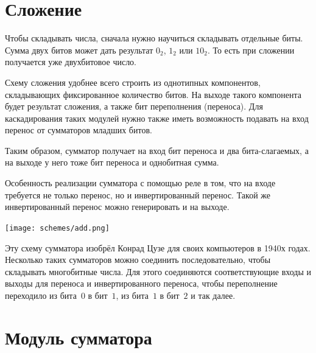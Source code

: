 \section{Сложение}


Чтобы складывать числа, сначала нужно научиться складывать отдельные биты.
Сумма двух битов может дать результат $0_2$, $1_2$ или $10_2$.
То есть при сложении получается уже двухбитовое число.

Схему сложения удобнее всего строить из однотипных компонентов, складывающих
фиксированное количество битов. На выходе такого компонента будет результат
сложения, а также бит переполнения (переноса). Для каскадирования
таких модулей нужно также иметь возможность подавать на вход перенос от
сумматоров младших битов.

Таким образом, сумматор получает на вход бит переноса и два бита-слагаемых, а на выходе
у него тоже бит переноса и однобитная сумма.


Особенность реализации сумматора с помощью реле в том, что на входе
требуется не только перенос, но и инвертированный перенос.
Такой же инвертированный перенос можно генерировать и на выходе.

\begin{center}
\texttt{[image: schemes/add.png]}
\end{center}

Эту схему сумматора изобрёл Конрад Цузе для своих компьютеров в 1940х годах.
Несколько таких сумматоров можно соединить последовательно, чтобы
складывать многобитные числа. Для этого соединяются соответствующие входы
и выходы для переноса и инвертированного переноса, чтобы
переполнение переходило из бита~$0$ в бит~$1$, из бита~$1$ в бит~$2$ и
так далее.

\section{Модуль сумматора}

